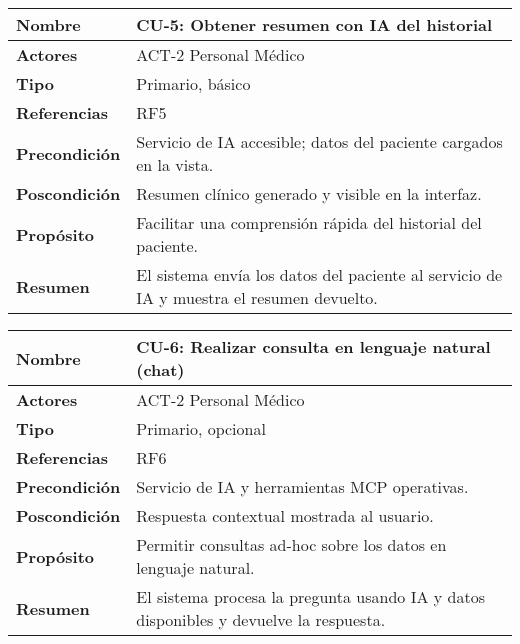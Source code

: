 \begin{table}[H]
    \centering
    \begin{tabular}{|l|p{11cm}|}
        \hline
        \textbf{Nombre} & CU-5: Obtener resumen con IA del historial \\
        \hline
        \textbf{Actores} & ACT-2 Personal Médico \\
        \hline
        \textbf{Tipo} & Primario, básico \\
        \hline
        \textbf{Referencias} & RF5 \\
        \hline
        \textbf{Precondición} & Servicio de IA accesible; datos del paciente cargados en la vista. \\
        \hline
        \textbf{Poscondición} & Resumen clínico generado y visible en la interfaz. \\
        \hline
        \textbf{Propósito} & Facilitar una comprensión rápida del historial del paciente. \\
        \hline
        \textbf{Resumen} & El sistema envía los datos del paciente al servicio de IA y muestra el resumen devuelto. \\
        \hline
    \end{tabular}
\end{table}

\begin{table}[H]
    \centering
    \begin{tabular}{|l|p{11cm}|}
        \hline
        \textbf{Nombre} & CU-6: Realizar consulta en lenguaje natural (chat) \\
        \hline
        \textbf{Actores} & ACT-2 Personal Médico \\
        \hline
        \textbf{Tipo} & Primario, opcional \\
        \hline
        \textbf{Referencias} & RF6 \\
        \hline
        \textbf{Precondición} & Servicio de IA y herramientas MCP operativas. \\
        \hline
        \textbf{Poscondición} & Respuesta contextual mostrada al usuario. \\
        \hline
        \textbf{Propósito} & Permitir consultas ad-hoc sobre los datos en lenguaje natural. \\
        \hline
        \textbf{Resumen} & El sistema procesa la pregunta usando IA y datos disponibles y devuelve la respuesta. \\
        \hline
    \end{tabular}
\end{table}


